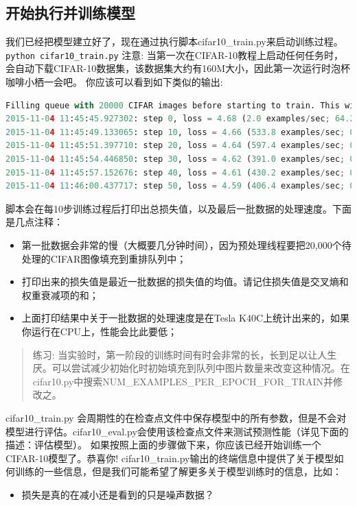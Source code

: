 \documentclass[11pt,fleqn]{book}
\begin{document}
{\subsection{开始执行并训练模型}
我们已经把模型建立好了，现在通过执行脚本cifar10\_train.py来启动训练过程。
\lstinline[language=Bash]{python cifar10_train.py}
注意: 当第一次在CIFAR-10教程上启动任何任务时，会自动下载CIFAR-10数据集，该数据集大约有160M大小，因此第一次运行时泡杯咖啡小栖一会吧。
你应该可以看到如下类似的输出:
\begin{lstlisting}[language=Python]
Filling queue with 20000 CIFAR images before starting to train. This will take a few minutes.
2015-11-04 11:45:45.927302: step 0, loss = 4.68 (2.0 examples/sec; 64.221 sec/batch)
2015-11-04 11:45:49.133065: step 10, loss = 4.66 (533.8 examples/sec; 0.240 sec/batch)
2015-11-04 11:45:51.397710: step 20, loss = 4.64 (597.4 examples/sec; 0.214 sec/batch)
2015-11-04 11:45:54.446850: step 30, loss = 4.62 (391.0 examples/sec; 0.327 sec/batch)
2015-11-04 11:45:57.152676: step 40, loss = 4.61 (430.2 examples/sec; 0.298 sec/batch)
2015-11-04 11:46:00.437717: step 50, loss = 4.59 (406.4 examples/sec; 0.315 sec/batch)
\end{lstlisting}
脚本会在每10步训练过程后打印出总损失值，以及最后一批数据的处理速度。下面是几点注释：
\begin{itemize}
\item 第一批数据会非常的慢（大概要几分钟时间），因为预处理线程要把20,000个待处理的CIFAR图像填充到重排队列中；
\item 打印出来的损失值是最近一批数据的损失值的均值。请记住损失值是交叉熵和权重衰减项的和；
\item 上面打印结果中关于一批数据的处理速度是在Tesla K40C上统计出来的，如果你运行在CPU上，性能会比此要低；
\end{itemize}
\begin{quote}
练习: 当实验时，第一阶段的训练时间有时会非常的长，长到足以让人生厌。可以尝试减少初始化时初始填充到队列中图片数量来改变这种情况。在cifar10.py中搜索NUM\_EXAMPLES\_PER\_EPOCH\_FOR\_TRAIN并修改之。
\end{quote}
cifar10\_train.py 会周期性的在检查点文件中保存模型中的所有参数，但是不会对模型进行评估。cifar10\_eval.py会使用该检查点文件来测试预测性能（详见下面的描述：评估模型）。
如果按照上面的步骤做下来，你应该已经开始训练一个CIFAR-10模型了。恭喜你!
cifar10\_train.py输出的终端信息中提供了关于模型如何训练的一些信息，但是我们可能希望了解更多关于模型训练时的信息，比如：
\begin{itemize}
\item 损失是真的在减小还是看到的只是噪声数据？

\end{itemize}}
\end{document}
